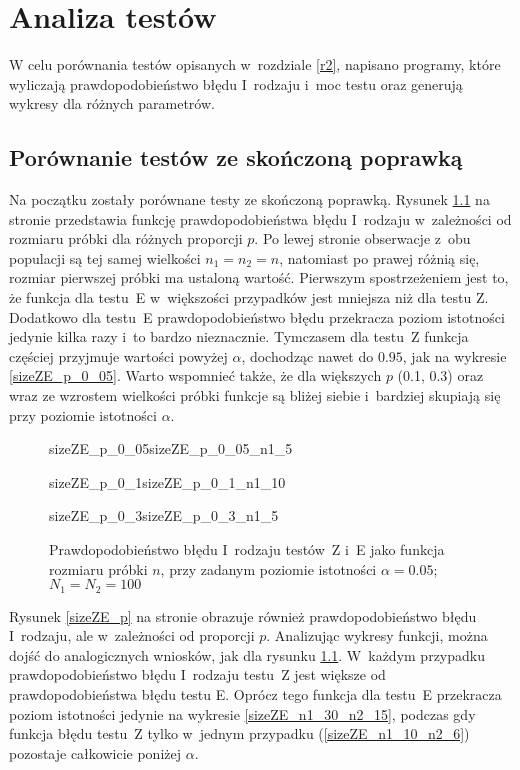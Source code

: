 \chapter{Analiza testów}
\label{r3}

W celu porównania testów opisanych w~rozdziale \ref{r2}, napisano programy, które wyliczają prawdopodobieństwo błędu I~rodzaju i~moc testu oraz generują wykresy dla różnych parametrów.

\section{Porównanie testów ze skończoną poprawką}
\label{r3:skonczonetesty}
Na początku zostały porównane testy ze skończoną poprawką. Rysunek \ref{sizeZE_n} na stronie \pageref{sizeZE_n} przedstawia funkcję prawdopodobieństwa błędu I~rodzaju w~zależności od rozmiaru próbki dla różnych proporcji $p$. Po lewej stronie obserwacje z~obu populacji są tej samej wielkości $n_1=n_2=n$, natomiast po prawej różnią się, rozmiar pierwszej próbki ma ustaloną wartość. Pierwszym spostrzeżeniem jest to, że funkcja dla testu~E w~większości przypadków jest mniejsza niż dla testu Z. Dodatkowo dla testu~E prawdopodobieństwo błędu przekracza poziom istotności jedynie kilka razy i~to bardzo nieznacznie. Tymczasem dla testu~Z funkcja częściej przyjmuje wartości powyżej $\alpha$, dochodząc nawet do $0.95$, jak na wykresie \ref{sizeZE_p_0_05}. Warto wspomnieć także, że dla większych $p$ (0.1, 0.3) oraz wraz ze wzrostem wielkości próbki funkcje są bliżej siebie i~bardziej skupiają się przy poziomie istotności $\alpha$.

\begin{figure}[!h]
	\begin{subdiagrams}{sizeZE_p_0_05}{sizeZE_p_0_05_n1_5}
	\end{subdiagrams}
	
	\begin{subdiagrams}{sizeZE_p_0_1}{sizeZE_p_0_1_n1_10}
	\end{subdiagrams}
	
	\begin{subdiagrams}{sizeZE_p_0_3}{sizeZE_p_0_3_n1_5}
	\end{subdiagrams}
	\caption{Prawdopodobieństwo błędu I~rodzaju testów~Z i~E jako funkcja rozmiaru próbki $n$, przy zadanym poziomie istotności $\alpha=0.05$; $N_1=N_2=100$}
	\label{sizeZE_n}
\end{figure}

Rysunek \ref{sizeZE_p} na stronie \pageref{sizeZE_p} obrazuje również prawdopodobieństwo błędu I~rodzaju, ale w~zależności od proporcji $p$. Analizując wykresy funkcji, można dojść do analogicznych wniosków, jak dla rysunku \ref{sizeZE_n}. W~każdym przypadku prawdopodobieństwo błędu I~rodzaju testu~Z jest większe od prawdopodobieństwa błędu testu E. Oprócz tego funkcja dla testu~E przekracza poziom istotności jedynie na wykresie \ref{sizeZE_n1_30_n2_15}, podczas gdy funkcja błędu testu~Z tylko w~jednym przypadku (\ref{sizeZE_n1_10_n2_6}) pozostaje całkowicie poniżej $\alpha$.

